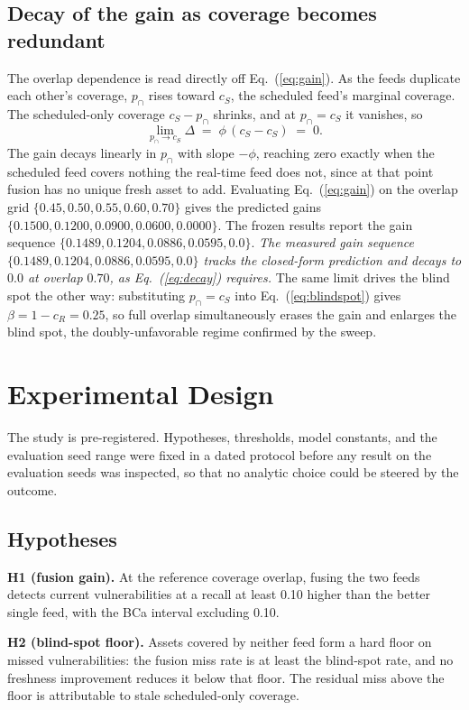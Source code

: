 \documentclass[journal]{IEEEtran}
\begin{document}
\subsection{Decay of the gain as coverage becomes redundant}
The overlap dependence is read directly off Eq.~(\ref{eq:gain}). As the feeds duplicate each other's
coverage, $p_{\cap}$ rises toward $c_S$, the scheduled feed's marginal coverage. The scheduled-only
coverage $c_S - p_{\cap}$ shrinks, and at $p_{\cap} = c_S$ it vanishes, so
\begin{equation}
\lim_{p_{\cap}\to c_S} \Delta \;=\; \phi\,(c_S - c_S) \;=\; 0.
\label{eq:decay}
\end{equation}
The gain decays linearly in $p_{\cap}$ with slope $-\phi$, reaching zero exactly when the scheduled
feed covers nothing the real-time feed does not, since at that point fusion has no unique fresh
asset to add. Evaluating Eq.~(\ref{eq:gain}) on the overlap grid
$\{0.45, 0.50, 0.55, 0.60, 0.70\}$ gives the predicted gains
$\{0.1500, 0.1200, 0.0900, 0.0600, 0.0000\}$. The frozen results report the gain sequence
$\{0.1489, 0.1204, 0.0886, 0.0595, 0.0\}$. \emph{The measured gain sequence
$\{0.1489, 0.1204, 0.0886, 0.0595, 0.0\}$ tracks the closed-form prediction and decays to $0.0$ at
overlap $0.70$, as Eq.~(\ref{eq:decay}) requires.} The same limit drives the blind spot the other
way: substituting $p_{\cap} = c_S$ into Eq.~(\ref{eq:blindspot}) gives $\beta = 1 - c_R = 0.25$, so
full overlap simultaneously erases the gain and enlarges the blind spot, the doubly-unfavorable
regime confirmed by the sweep.

\section{Experimental Design}
The study is pre-registered. Hypotheses, thresholds, model constants, and the evaluation seed range
were fixed in a dated protocol before any result on the evaluation seeds was inspected, so that no
analytic choice could be steered by the outcome.

\subsection{Hypotheses}
\textbf{H1 (fusion gain).} At the reference coverage overlap, fusing the two feeds detects current
vulnerabilities at a recall at least 0.10 higher than the better single feed, with the BCa interval
excluding 0.10.

\textbf{H2 (blind-spot floor).} Assets covered by neither feed form a hard floor on missed
vulnerabilities: the fusion miss rate is at least the blind-spot rate, and no freshness improvement
reduces it below that floor. The residual miss above the floor is attributable to stale
scheduled-only coverage.
\end{document}
